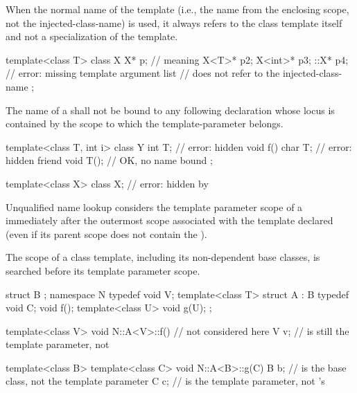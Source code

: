 \pnum
When the normal name of the template (i.e., the name from
the enclosing scope, not the injected-class-name) is
used,
it always refers to the class template itself and not a
specialization of the template.
\begin{example}
\begin{codeblock}
template<class T> class X {
  X* p;                                 // meaning 
  X<T>* p2;
  X<int>* p3;
  ::X* p4;                              // error: missing template argument list
                                        //  does not refer to the injected-class-name
};
\end{codeblock}
\end{example}

\pnum
The name of a 
shall not be bound to any following declaration
whose locus is contained by the scope
to which the template-parameter belongs.
\begin{example}
\begin{codeblock}
template<class T, int i> class Y {
  int T;                                // error:  hidden
  void f() {
    char T;                             // error:  hidden
  }
  friend void T();                      // OK, no name bound
};

template<class X> class X;              // error: hidden by 
\end{codeblock}
\end{example}

\pnum
Unqualified name lookup considers
the template parameter scope of a 
immediately after the outermost scope associated with the template declared
(even if its parent scope does not contain
the ).
\begin{note}
The scope of a class template,
including its non-dependent base classes,
is searched before its template parameter scope.
\end{note}
\begin{example}
\begin{codeblock}
struct B { };
namespace N {
  typedef void V;
  template<class T> struct A : B {
    typedef void C;
    void f();
    template<class U> void g(U);
  };
}

template<class V> void N::A<V>::f() {   //  not considered here
  V v;                                  //  is still the template parameter, not 
}

template<class B> template<class C> void N::A<B>::g(C) {
  B b;                                  //  is the base class, not the template parameter
  C c;                                  //  is the template parameter, not 's 
}
\end{codeblock}
\end{example}

